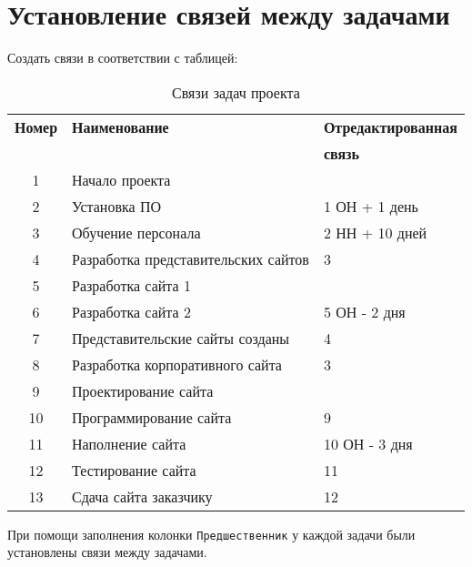 \chapter{Установление связей между задачами}

Создать связи в соответствии с таблицей:

\begin{table}[!h]
    \begin{center}
        \caption{Связи задач проекта}
        \begin{tabular}{|c|l|l|}
            \hline
            \bfseries Номер & \bfseries Наименование & \bfseries Отредактированная \\
            & & \bfseries связь \\\hline
            1 & Начало проекта &  \\
            2 & Установка ПО & 1 ОН + 1 день \\
            3 & Обучение персонала & 2 НН + 10 дней \\
            4 & Разработка представительских сайтов & 3 \\
            5 & Разработка сайта 1 & \\
            6 & Разработка сайта 2 & 5 ОН - 2 дня \\
            7 & Представительские сайты созданы & 4 \\
            8 & Разработка корпоративного сайта & 3 \\
            9 & Проектирование сайта & \\
            10 & Программирование сайта & 9 \\
            11 & Наполнение сайта & 10 ОН - 3 дня \\
            12 & Тестирование сайта & 11 \\
            13 & Сдача сайта заказчику & 12 \\
            \hline
        \end{tabular}
    \end{center}
\end{table}

При помощи заполнения колонки \texttt{Предшественник} у каждой задачи были установлены связи между задачами.

